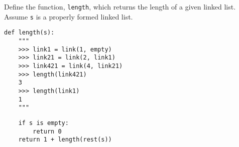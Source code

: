 \begin{blocksection}
\question Define the function, \lstinline$length$, which returns the length of a given linked list. Assume \lstinline$s$ is a properly formed linked list.

\begin{lstlisting}
def length(s):
    """
    >>> link1 = link(1, empty)
    >>> link21 = link(2, link1)
    >>> link421 = link(4, link21)
    >>> length(link421)
    3
    >>> length(link1)
    1
    """
\end{lstlisting}

\begin{solution}[1in]
\begin{lstlisting}
    if s is empty:
        return 0
    return 1 + length(rest(s))
\end{lstlisting}
\end{solution}
\end{blocksection}
